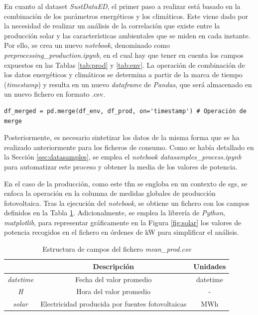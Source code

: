 En cuanto al dataset \textit{SustDataED}, el primer paso a realizar está basado en la combinación de los parámetros energéticos y los climáticos. Este viene dado por la necesidad de realizar un análisis de la correlación que existe entre la producción solar y las características ambientales que se miden en cada instante. Por ello, se crea un nuevo \textit{notebook}, denominado como \textit{preprocessing\_production.ipynb}, en el cual hay que tener en cuenta los campos expuestos en las Tablas \ref{tab:prod} y \ref{tab:env}. La operación de combinación de los datos energéticos y climáticos se determina a partir de la marca de tiempo (\textit{timestamp}) y resulta en un nuevo \textit{dataframe} de \textit{Pandas}, que será almacenado en un nuevo fichero en formato .csv.

\vspace{3mm}

\begin{lstlisting}[style=Python, caption={Combinación de ficheros}]
  df_merged = pd.merge(df_env, df_prod, on='timestamp') # Operación de merge
\end{lstlisting}

\vspace{3mm}

Posteriormente, es necesario sintetizar los datos de la misma forma que se ha realizado anteriormente para los ficheros de consumo. Como se había detallado en la Sección \ref{sec:datasamples}, se emplea el \textit{notebook} \textit{datasamples\_process.ipynb} para automatizar este proceso y obtener la media de los valores de potencia. 

\vspace{3mm}

En el caso de la producción, como este \gls{tfm} se engloba en un contexto de \gls{sg}s, se enfoca la operación en la columna de medidas globales de producción fotovoltaica. Tras la ejecución del \textit{notebook}, se obtiene un fichero con los campos definidos en la Tabla \ref{tab:prodsamples}. Adicionalmente, se emplea la librería de \textit{Python}, \textit{matplotlib}, para representar gráficamente en la Figura \ref{fig:solar} los valores de potencia recogidos en el fichero en órdenes de kW para simplificar el análisis.

\vspace{3mm}

\begin{table}[h!]
  \centering
  \begin{tabular}{|c|c|c|}
  \hline
  \rowcolor[HTML]{AAAAAA} 
  \multicolumn{1}{|c|}{\cellcolor[HTML]{AAAAAA}Campo} & \multicolumn{1}{c|}{\cellcolor[HTML]{AAAAAA}Descripción} & Unidades \\ \hline
  \textit{datetime} & Fecha del valor promedio & datetime \\ \hline
  \textit{H} & Hora del valor promedio & - \\ \hline
  \textit{solar} & Electricidad producida por fuentes fotovoltaicas & MWh \\ \hline
  \end{tabular}
  \caption{Estructura de campos del fichero \textit{mean\_prod.csv}}
  \label{tab:prodsamples}
\end{table}

